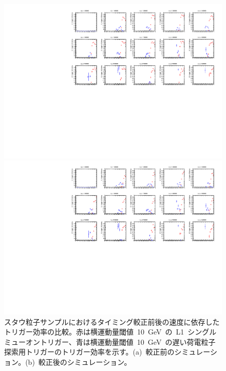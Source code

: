 \begin{figure}[H]
    \begin{minipage}{0.49\hsize}
    \centering   
    \includegraphics[width=\textwidth,page=2]{img/rec/stau_600_ori.pdf}
    \subcaption{}
    \end{minipage}
    \begin{minipage}{0.49\hsize}
    \centering   
    \includegraphics[width=\textwidth,page=2]{img/rec/stau_600.pdf}
    \subcaption{}
    \end{minipage}
    \caption[スタウ粒子サンプルにおけるタイミング較正前後の速度に依存したトリガー効率の比較]{スタウ粒子サンプルにおけるタイミング較正前後の速度に依存したトリガー効率の比較。赤は横運動量閾値~10~GeV~の~L1~シングルミューオントリガー、青は横運動量閾値~10~GeV~の遅い荷電粒子探索用トリガーのトリガー効率を示す。(a)~較正前のシミュレーション。(b)~較正後のシミュレーション。}\label{fig:tribeta}
\end{figure}
